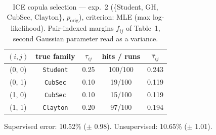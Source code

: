 \begin{table}[htbp]
  \centering
  \caption{ICE copula selection — exp.\ 2 (\{Student, GH, CubSec, Clayton\}, $p_{\text{orig}}$), criterion: MLE (max log-likelihood). Pair-indexed margins $f_{ij}$ of Table~1, second Gaussian parameter read as a variance.}
  \label{tab:exp3-exp2_orig_p__mle}
  \begin{tabular}{ccccc}
    \toprule
    $(i, j)$ & true family & $\tau_{ij}$ & hits / runs & $\hat\tau_{ij}$ \\
    \midrule
    (0, 0) & \texttt{Student} & 0.25 & 100/100 & 0.243 \\
    (0, 1) & \texttt{CubSec} & 0.10 & 19/100 & 0.119 \\
    (1, 0) & \texttt{CubSec} & 0.10 & 15/100 & 0.119 \\
    (1, 1) & \texttt{Clayton} & 0.20 & 97/100 & 0.194 \\
    \bottomrule
  \end{tabular}
  \par\smallskip Supervised error: 10.52\% ($\pm$ 0.98). Unsupervised: 10.65\% ($\pm$ 1.01).
\end{table}
